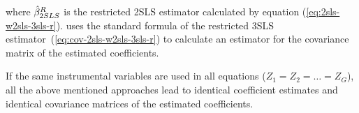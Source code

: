 where $\hat{\beta}^R_{2SLS}$ is the restricted 2SLS estimator calculated
by equation (\ref{eq:2sls-w2sls-3sls-r}).
 uses the standard formula of the restricted 3SLS
estimator~(\ref{eq:cov-2sls-w2sls-3sls-r}) to calculate an estimator
for the covariance matrix of the estimated coefficients.


If the same instrumental variables are used in all equations 
($Z_1 = Z_2 = \ldots = Z_G$),
all the above mentioned approaches lead to identical coefficient estimates
and identical covariance matrices of the estimated coefficients.

